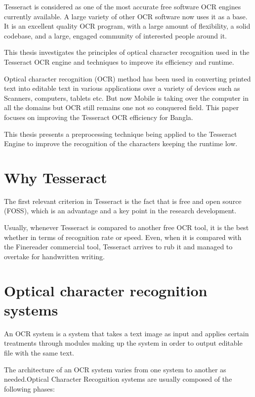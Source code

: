 Tesseract is considered as one of the most accurate free software OCR engines currently available. A large variety of other OCR software now uses it as a base. It is an excellent quality OCR program, with a large amount of flexibility, a solid codebase, and a large, engaged community of interested people around it.

This thesis investigates the principles of optical character recognition used in the Tesseract OCR engine and techniques to improve its efficiency and runtime. 

Optical character recognition (OCR) method has been used in converting printed text into editable text in various applications over a variety of devices such as Scanners, computers, tablets etc. But now Mobile is taking over the computer in all the domains but OCR still remains one not so conquered field. This paper focuses on improving the Tesseract OCR efficiency for Bangla. 

This thesis presents a preprocessing technique being applied to the Tesseract Engine to improve the recognition of the characters keeping the runtime low.

\section{Why Tesseract}
The first relevant criterion in Tesseract is the fact that is free and open source (FOSS), which is an advantage and a key point in the research development.

Usually, whenever Tesseract is compared to another free OCR tool, it is the best whether in terms of recognition rate or speed. Even, when it is compared with the Finereader commercial tool, Tesseract arrives to rub it and managed to overtake for handwritten writing.

\section{Optical character recognition systems}
An OCR system is a system that takes a text image as input and applies certain treatments through modules making up the system in order to output editable file with the same text.

The architecture of an OCR system varies from one system to another as needed.Optical Character Recognition systems are usually composed of the following phases:

